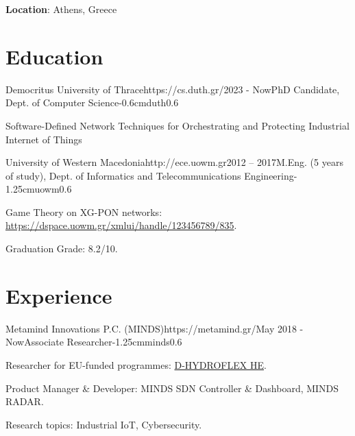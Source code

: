 \documentclass{mycv}
\begin{document}
	\thispagestyle{plain}

	\textbf{Location}: Athens, Greece

    \section{Education}
	\begin{EntryDatedLogo}{Democritus University of Thrace}{https://cs.duth.gr/}{2023 - Now}{PhD Candidate, Dept. of Computer Science}{-0.6cm}{duth}{0.6}
		\begin{Itemize}
			\item Software-Defined Network Techniques for Orchestrating and Protecting Industrial Internet of Things
		\end{Itemize}
	\end{EntryDatedLogo}

	\vspace*{0.5cm}
	
	\begin{EntryDatedLogo}{University of Western Macedonia}{http://ece.uowm.gr}{2012 -- 2017}{M.Eng. (5 years of study), Dept. of Informatics and Telecommunications Engineering}{-1.25cm}{uowm}{0.6}
		\begin{Itemize}
			\item Game Theory on XG-PON networks: \url{https://dspace.uowm.gr/xmlui/handle/123456789/835}.
			\item Graduation Grade: 8.2/10.
		\end{Itemize}
	\end{EntryDatedLogo}
	
	\section{Experience}
	\begin{EntryDatedLogo}{Metamind Innovations P.C. (MINDS)}{https://metamind.gr/}{May 2018 - Now}{Associate Researcher}{-1.25cm}{minds}{0.6}
		\begin{Itemize}
			\item Researcher for EU-funded programmes: \href{https://cordis.europa.eu/project/id/101122357}{D-HYDROFLEX HE}.
			\item Product Manager \& Developer: MINDS SDN Controller \& Dashboard, MINDS RADAR.
			\item Research topics: Industrial IoT, Cybersecurity.
		\end{Itemize}
	\end{EntryDatedLogo}
\end{document}
